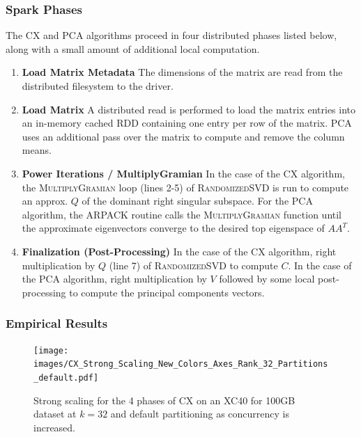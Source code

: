   \subsubsection{Spark Phases}
  The CX and PCA algorithms proceed in four distributed phases listed below, along with a small amount of additional local computation.
  \begin{enumerate}
      \item \textbf{Load Matrix Metadata}
         The dimensions of the matrix are read from the distributed filesystem to the driver.
      \item \textbf{Load Matrix}
         A distributed read is performed to load the matrix entries into an in-memory cached
         RDD containing one entry per row of the matrix. PCA uses an additional pass over the matrix to compute and remove the column means.
       \item \textbf{Power Iterations / MultiplyGramian}
         In the case of the CX algorithm, the \textsc{MultiplyGramian} loop (lines 2-5) of
         \textsc{RandomizedSVD} is run to compute an approx. $Q$
         of the dominant right singular subspace. For the PCA algorithm, the ARPACK routine calls the \textsc{MultiplyGramian} function
         until the approximate eigenvectors converge to the desired top eigenspace of $AA^T.$
       \item \textbf{Finalization (Post-Processing)}
         In the case of the CX algorithm, right multiplication by $Q$ (line 7) of \textsc{RandomizedSVD} to compute $C$. In the case of the PCA algorithm,
         right multiplication by $V$ followed by some local post-processing to compute the principal components vectors.
  \end{enumerate}

  \subsubsection{Empirical Results}

    \begin{figure} [h!btp]
    \begin{centering}
    \texttt{[image: images/CX\_Strong\_Scaling\_New\_Colors\_Axes\_Rank\_32\_Partitions\_default.pdf]}
    \end{centering}
    \caption{ Strong scaling for the 4 phases of CX on an XC40 for 100GB dataset at $k=32$ and default partitioning as concurrency is increased.} 
    \label{fig:xc40scaling}
    \end{figure} 

